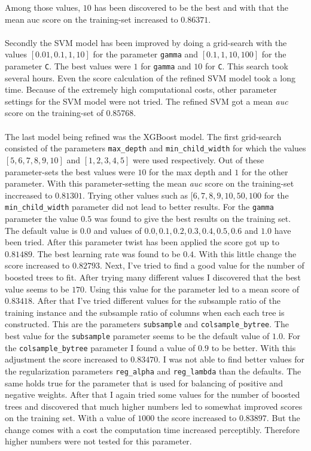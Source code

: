 \documentclass[11pt]{article}
\begin{document}
Among those values, $10$ has been discovered to be the best and with that
the mean {\it} auc score on the training-set increased to $0.86371$.
\\ \\
Secondly the SVM model has been improved by doing a grid-search 
with the values $[0.01, 0.1, 1, 10]$ for the
parameter {\tt gamma} and $[0.1, 1, 10, 100]$ for the parameter {\tt C}.
The best values were $1$ for {\tt gamma} and $10$ for {\tt C}. This search
took several hours. Even the score calculation of the refined SVM model
took a long time. Because of the extremely high computational costs, 
other parameter settings for the SVM model were not tried.
The refined SVM got a mean {\it auc} score on the training-set of $0.85768$.
\\ \\
The last model being refined was the XGBoost model. The first grid-search
consisted of the parameters {\tt max\_depth} and {\tt min\_child\_width}
for which the values $[5, 6, 7, 8, 9, 10]$ and $[1, 2, 3, 4, 5]$ were used respectively.
Out of these parameter-sets the best values were $10$ for the max depth
and $1$ for the other parameter. With this parameter-setting the 
mean {\it auc} score on the training-set inccreased to $0.81301$.
Trying other values such as $[6, 7, 8, 9, 10, 50, 100$ for the {\tt min\_child\_width}
parameter did not lead to better results. For the {\tt gamma} parameter the
value $0.5$ was found to give the best results on the training set. 
The default value is $0.0$ and values of $0.0, 0.1, 0.2, 0.3, 0.4, 0.5, 0.6$ and $1.0$
have been tried. After this parameter twist has been applied the score got up to
$0.81489$. The best learning rate was found to be $0.4$. With this little change
the score increased to $0.82793$. Next, I've tried to find a good value for the
number of boosted trees to fit. After trying many different values I discovered
that the best value seems to be $170$. Using this value for the parameter led
to a mean score of $0.83418$. After that I've tried different values for
the subsample ratio of the training instance and the subsample ratio of columns when
each each tree is constructed. This are the parameters {\tt subsample} and
{\tt colsample\_bytree}. The best value for the {\tt subsample} parameter
seems to be the default value of $1.0$. For the {\tt colsample\_bytree} parameter
I found a value of $0.9$ to be better. With this adjustment the score
increased to $0.83470$. I was not able to find better values for the regularization
parameters {\tt reg\_alpha} and {\tt reg\_lambda} than the defaults. The same holds 
true for the parameter that is used for balancing of positive and negative weights.
After that I again tried some values for the number of boosted trees and discovered
that much higher numbers led to somewhat improved scores on the training set.
With a value of $1000$ the score increased to $0.83897$. But the change comes with
a cost the computation time increased perceptibly. Therefore higher numbers
were not tested for this parameter.
\end{document}
